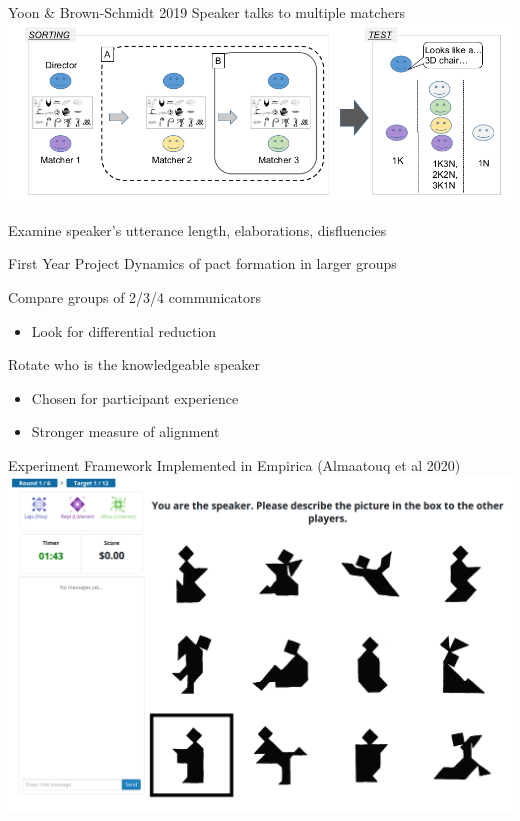 \documentclass[ 12pt, xcolor=beamer,table,usenames,dvipsnames, ignorenonframetext, ngerman]{beamer}
\begin{document}
\begin{frame}{Yoon \& Brown-Schmidt 2019}
	Speaker talks to multiple matchers \\
	
	
	\includegraphics[width=\textwidth]{../images/yoon_diagram.png}
	
	Examine speaker's utterance length, elaborations, disfluencies
\end{frame}
%
\begin{frame}{First Year Project}
	Dynamics of pact formation in larger groups \pause
	
	Compare groups of 2/3/4 communicators
	\begin{itemize}
		\item Look for differential reduction \pause
	\end{itemize} 
Rotate who is the knowledgeable speaker
\begin{itemize}
	\item Chosen for participant experience
	\item Stronger measure of alignment
\end{itemize}

\end{frame}

\begin{frame}{Experiment Framework}
Implemented in Empirica (Almaatouq et al 2020) 
 \includegraphics[width=.9\textwidth]{../images/interface.PNG}
\end{frame}
\end{document}
